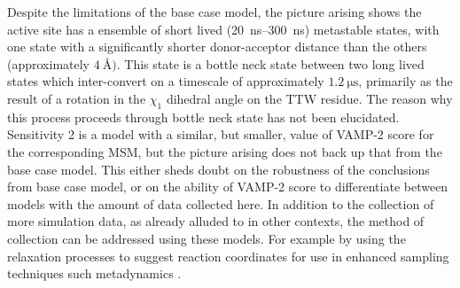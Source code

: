 Despite the limitations of the base case model, the picture arising shows the active site has a ensemble of short lived (\SIrange{20}{300}{\nano\second}) metastable states, with one state with a significantly shorter donor-acceptor distance than the others (approximately $\SI{4}{\angstrom})$. This state is a bottle neck state between two long lived states which inter-convert on a timescale of approximately $\SI{1.2}{\micro\second}$, primarily as the result of a rotation in the $\chi_1$ dihedral angle on the TTW residue. The reason why this process proceeds through bottle neck state has not been elucidated. Sensitivity 2 is a model with a similar, but smaller, value of VAMP-2 score for the corresponding MSM, but the picture arising does not back up that from the base case model. This either sheds doubt on the robustness of the conclusions from base case model, or on the ability of VAMP-2 score to differentiate between models with the amount of data collected here. In addition to the collection of more simulation data, as already alluded to in other contexts, the method of collection can be addressed using these models. For example by using the relaxation processes to suggest reaction coordinates for use in enhanced sampling techniques such metadynamics \cite{laioEscapingFreeenergyMinima2002}. 











